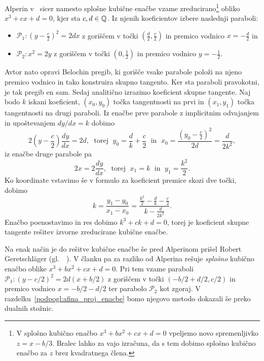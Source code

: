 Alperin v~\cite[str.\ 129]{alperin2000} sicer namesto splošne kubične enačbe vzame zreducirano\footnote{V splošno kubično enačbo $x^3 + bx^2 + cx + d = 0$ vpeljemo novo spremenljivko $z = x - b/3$. Bralec lahko za vajo izračuna, da s tem dobimo splošno kubično enačbo za $z$ brez kvadratnega člena.} obliko $x^3 + cx + d = 0$, kjer sta $c, d \in \mathbb Q$. Iz njenih koeficientov izbere naslednji paraboli:
\begin{itemize}
    \item $\mathcal{P}_1: \left(y - \frac{c}{2}\right)^2 = 2dx$ z goriščem v točki $(\frac{d}{2}, \frac{c}{2})$ in premico vodnico $x = -\frac{d}{2}$ in
    \item $\mathcal{P}_2:  x^2 = 2y$ z goriščem v točki $(0, \frac{1}{2})$ in premico vodnico $y = -\frac{1}{2}$.
\end{itemize}
Avtor nato opravi Belochin pregib, ki gorišče vsake parabole položi na njeno premico vodnico in tako konstruira skupno tangento. Ker sta paraboli pravokotni, je tak pregib en sam.
Sedaj analitično izrazimo koeficient skupne tangente. Naj bodo $k$ iskani koeficient, $(x_0, y_0)$ točka tangentnosti na prvi in $(x_1, y_1)$ točka tangentnosti na drugi paraboli. Iz enačbe prve parabole z implicitnim odvajanjem in upoštevanjem $dy/dx = k$ dobimo
$$ 2\left(y - \frac{c}{2}\right) \frac{dy}{dx} = 2d, \; \text{ torej } \; y_0 = \frac{d}{k} + \frac{c}{2} \; \text{ in } \; x_0 = \frac{\left(y_0 - \frac{c}{2}\right)^2}{2d} = \frac{d}{2k^2},$$
iz enačbe druge parabole pa
$$ 2x = 2\frac{dy}{dx}, \; \text{ torej } \; x_1 = k \; \text{ in } \; y_1 = \frac{k^2}{2}. $$
Ko koordinate vstavimo še v formulo za koeficient premice skozi dve točki, dobimo
$$ k = \frac{y_1 - y_0}{x_1 - x_0} = \frac{\frac{k^2}{2} - \frac{d}{k} - \frac{c}{2}}{k - \frac{d}{2k^2}}.
$$
Enačbo poenostavimo in res dobimo $k^3 + ck + d = 0$, torej je koeficient skupne tangente rešitev izvorne zreducirane kubične enačbe.

\begin{opomba}
    \label{opom:geret_metoda}
    Na enak način je do rešitve kubične enačbe še pred Alperinom prišel Robert Geretschläger (gl.\ ~\cite[368--369]{geret1995}). V članku pa za razliko od Alperina rešuje \emph{splošno} kubično enačbo oblike $x^3 + bx^2 + cx + d = 0$. Pri tem vzame paraboli $\mathcal{P}_1: (y-c/2)^2 = 2d(x+b/2)$ z goriščem v točki $(-b/2+d/2, c/2)$ in premico vodnico $x = -b/2-d/2$ ter parabolo $\mathcal{P}_2$ kot zgoraj. V razdelku~\ref{podpogl:afina_proj_enacbe} bomo njegovo metodo dokazali še preko dualnih stožnic.
\end{opomba}

